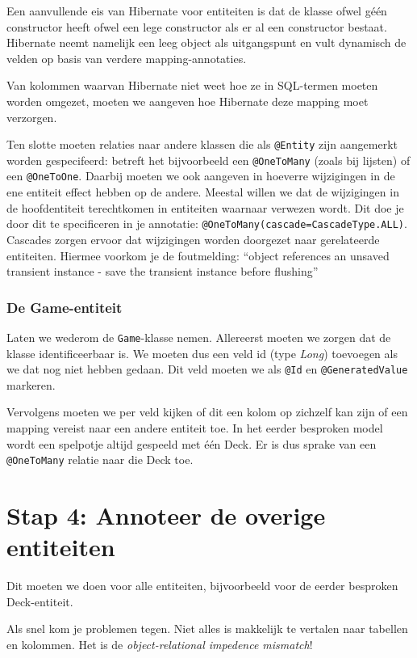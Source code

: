 Een aanvullende eis van Hibernate voor entiteiten is
dat de klasse ofwel géén constructor heeft 
ofwel een lege constructor als er al een constructor bestaat. 
Hibernate neemt namelijk een leeg 
object als uitgangspunt en vult dynamisch de velden op basis van 
verdere mapping-annotaties.

Van kolommen waarvan Hibernate niet weet hoe ze in SQL-termen moeten 
worden omgezet, moeten we aangeven hoe Hibernate deze mapping moet 
verzorgen.

Ten slotte moeten relaties naar andere klassen die als
\texttt{@Entity} zijn aangemerkt worden gespecifeerd:
betreft het bijvoorbeeld een \texttt{@OneToMany} (zoals bij lijsten) of een
\texttt{@OneToOne}. Daarbij moeten we ook aangeven in hoeverre 
wijzigingen in de ene entiteit effect hebben op de andere.
Meestal willen we dat de wijzigingen in de hoofdentiteit 
terechtkomen in entiteiten waarnaar verwezen wordt. 
Dit doe je door dit te specificeren in je 
annotatie: \texttt{@OneToMany(cascade=CascadeType.ALL)}. 
Cascades zorgen ervoor dat wijzigingen worden doorgezet 
naar gerelateerde entiteiten. 
Hiermee voorkom je de foutmelding: 
``object references an unsaved transient instance 
- save the transient instance before flushing''

\subsubsection{De Game-entiteit}
Laten we wederom de \texttt{Game}-klasse nemen. Allereerst moeten 
we zorgen dat de klasse identificeerbaar is. We moeten dus een 
veld id (type \textit{Long}) toevoegen als we dat nog niet hebben gedaan.
Dit veld moeten we als \texttt{@Id} en \texttt{@GeneratedValue} markeren.

Vervolgens moeten we per veld kijken of dit een kolom op zichzelf kan zijn 
of een mapping vereist naar een andere entiteit toe. In het eerder besproken model 
wordt een spelpotje altijd gespeeld met één Deck. Er is dus sprake van een 
\texttt{@OneToMany} relatie naar die Deck toe.

\section{Stap 4: Annoteer de overige entiteiten}
Dit moeten we doen voor alle entiteiten, bijvoorbeeld voor de 
eerder besproken Deck-entiteit. 

Als snel kom je problemen tegen. Niet alles is makkelijk te vertalen naar 
tabellen en kolommen. Het is de \textit{object-relational impedence mismatch}!

